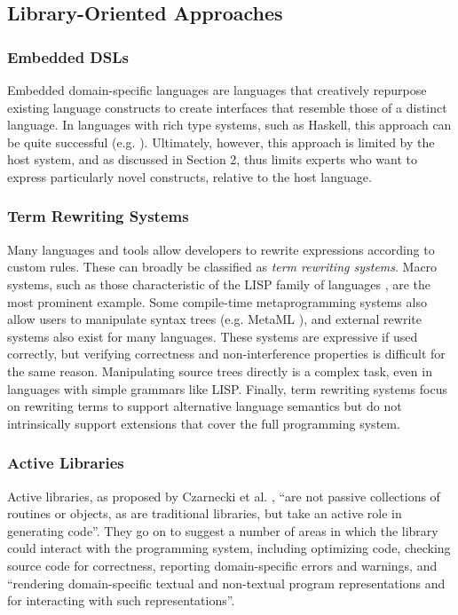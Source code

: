 \subsection{Library-Oriented Approaches}
\subsubsection{Embedded DSLs}
Embedded domain-specific languages are languages that creatively repurpose existing language constructs to create interfaces that resemble those of a distinct language. In languages with rich type systems, such as Haskell, this approach can be quite successful (e.g. \cite{svensson2011obsidian}). Ultimately, however, this approach is limited by the host system, and as discussed in Section 2, thus limits experts who want to express particularly novel constructs, relative to the host language. 

\subsubsection{Term Rewriting Systems}
Many languages and tools allow developers to rewrite expressions according to custom rules. These can broadly be classified as {\it term rewriting systems}. Macro systems, such as those characteristic of the LISP family of languages \cite{mccarthy1978history}, are the most prominent example. Some compile-time metaprogramming systems also allow users to manipulate syntax trees (e.g. MetaML \cite{Sheard:1999:UMS}), and external rewrite systems also exist for many languages. These systems are expressive if used correctly, but verifying correctness and non-interference properties is difficult for the same reason. Manipulating source trees directly is a complex task, even in languages with simple grammars like LISP. Finally, term rewriting systems focus on rewriting terms to support alternative language semantics but do not intrinsically support extensions that cover the full programming system.

\subsubsection{Active Libraries}
Active libraries, as proposed by Czarnecki et al. \cite{activelibraries}, ``are not passive collections of routines or objects, as are traditional libraries, but take an active role in generating code''. They go on to suggest a number of areas in which the library could interact with the programming system, including optimizing code, checking source code for correctness, reporting domain-specific errors and warnings, and ``rendering domain-specific textual and non-textual program representations and for interacting with such representations''. 

